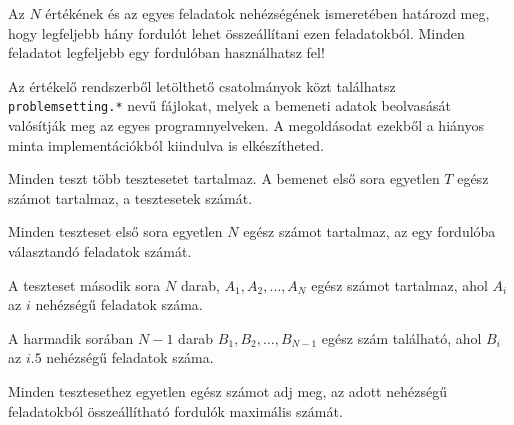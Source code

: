 Az $N$ értékének és az egyes feladatok nehézségének ismeretében határozd meg, hogy legfeljebb hány fordulót lehet összeállítani ezen feladatokból.
Minden feladatot legfeljebb egy fordulóban használhatsz fel!

\begin{warning}
Az értékelő rendszerből letölthető csatolmányok közt találhatsz
\texttt{problemsetting.*} nevű fájlokat, melyek a bemeneti adatok beolvasását valósítják meg az egyes programnyelveken.
A megoldásodat ezekből a hiányos minta implementációkból kiindulva is elkészítheted.
\end{warning}



\InputFile

Minden teszt több tesztesetet tartalmaz. A bemenet első sora egyetlen $T$ egész számot tartalmaz, a tesztesetek számát.

Minden teszteset első sora egyetlen $N$ egész számot tartalmaz, az egy fordulóba választandó feladatok számát.

A teszteset második sora $N$ darab,  $A_1, A_2,\ldots, A_N$ egész számot tartalmaz, ahol $A_i$ az $i$ nehézségű feladatok száma.

A harmadik sorában $N-1$ darab $B_1,B_2,\ldots,B_{N-1}$ egész szám található, ahol $B_i$ az $i.5$ nehézségű feladatok száma.

\OutputFile

Minden tesztesethez egyetlen egész számot adj meg, az adott nehézségű feladatokból összeállítható fordulók maximális számát.



